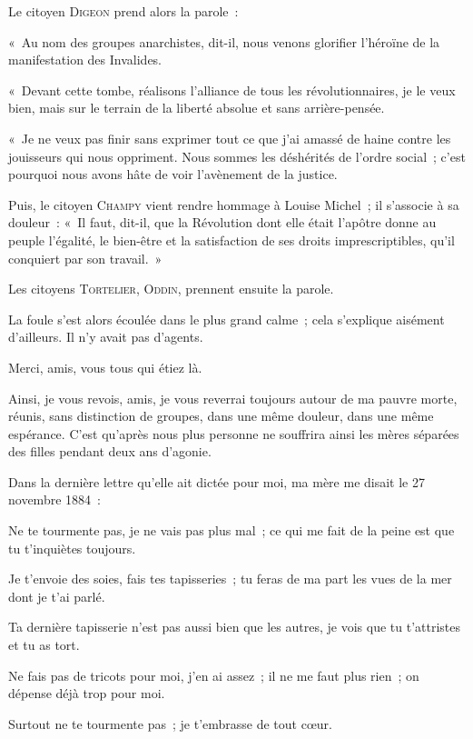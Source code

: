 \documentclass[french,twoside]{book} %
\newcommand{\salute}[1]{\bigbreak{#1}\par\medbreak}
\newenvironment{quoteblock}%
  {\begin{quoting}}
  {\end{quoting}}
\newenvironment{quotebar}{%
    \def\FrameCommand{{\color{rubric!10!}\vrule width 0.5em} \hspace{0.9em}}%
    \def\OuterFrameSep{\itemsep} %
    \MakeFramed {\advance\hsize-\width \FrameRestore}
  }%
  {%
    \endMakeFramed
  }
\renewenvironment{quoteblock}%
  {%
    \savenotes
    \setstretch{0.9}
    \normalfont
    \begin{quotebar}
  }
  {%
    \end{quotebar}
    \spewnotes
  }
\begin{document}
\begin{quoteblock}
 \bigbreak
 \noindent Le citoyen D{\scshape igeon} prend alors la parole :\par
 \bigbreak
 \noindent « Au nom des groupes anarchistes, dit-il, nous venons glorifier l’héroïne de la manifestation des Invalides.\par
 « Devant cette tombe, réalisons l’alliance de tous les révolutionnaires, je le veux bien, mais sur le terrain de la liberté absolue et sans arrière-pensée.\par
 « Je ne veux pas finir sans exprimer tout ce que j’ai amassé de haine contre les jouisseurs qui nous oppriment. Nous sommes les déshérités de l’ordre social ; c’est pourquoi nous avons hâte de voir l’avènement de la justice.\par
 \bigbreak
 \noindent Puis, le citoyen C{\scshape hampy} vient rendre hommage à Louise Michel ; il s’associe à sa douleur : « Il faut, dit-il, que la Révolution dont elle était l’apôtre donne au peuple l’égalité, le bien-être et la satisfaction de ses droits imprescriptibles, qu’il conquiert par son travail. »\par
 Les citoyens T{\scshape ortelier}, O{\scshape ddin}, prennent ensuite la parole.\par
 La foule s’est alors écoulée dans le plus grand calme ; cela s’explique aisément d’ailleurs. Il n’y avait pas d’agents.
 \end{quoteblock}

\noindent Merci, amis, vous tous qui étiez là.\par
Ainsi, je vous revois, amis, je vous reverrai toujours autour de ma pauvre morte, réunis, sans distinction de groupes, dans une même douleur, dans une même espérance. C’est qu’après nous plus personne ne souffrira ainsi les mères séparées des filles pendant deux ans d’agonie.\par
 Dans la dernière lettre qu’elle ait dictée pour moi, ma mère me disait le 27 novembre 1884 :\par

\begin{quoteblock}
 
\salute{Ma chère fille.}
 \noindent Ne te tourmente pas, je ne vais pas plus mal ; ce qui me fait de la peine est que tu t’inquiètes toujours.\par
 Je t’envoie des soies, fais tes tapisseries ; tu feras de ma part les vues de la mer dont je t’ai parlé.\par
 Ta dernière tapisserie n’est pas aussi bien que les autres, je vois que tu t’attristes et tu as tort.\par
 Ne fais pas de tricots pour moi, j’en ai assez ; il ne me faut plus rien ; on dépense déjà trop pour moi.\par
 Surtout ne te tourmente pas ; je t’embrasse de tout cœur.
 \end{quoteblock}
\end{document}
